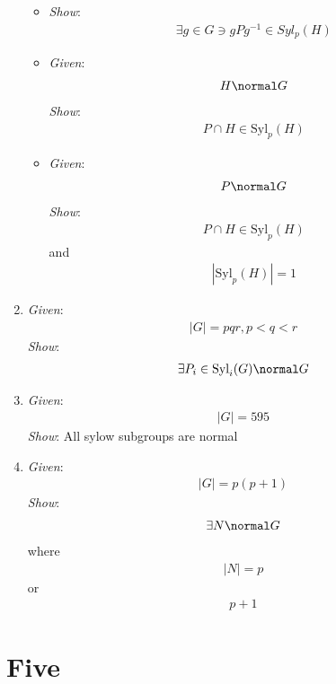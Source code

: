 \begin{enumerate}
  \begin{itemize}
  \tightlist
  \item
    \emph{Show}:
    \begin{align*}\exists g \in G \ni gPg^{-1} \in Syl_p(H)\end{align*}
  \item
    \emph{Given}: \begin{align*}H \normal G\end{align*} \emph{Show}:
    \begin{align*}P\cap H \in \text{Syl}_p(H)\end{align*}
  \item
    \emph{Given}: \begin{align*}P \normal G\end{align*} \emph{Show}:
    \begin{align*}P \cap H \in \text{Syl}_p(H)\end{align*} and
    \begin{align*}|\text{Syl}_p(H)| = 1\end{align*}
  \end{itemize}
\item
  \emph{Given}: \begin{align*}|G| = pqr, p < q < r\end{align*}
  \emph{Show}:
  \begin{align*}\exists P_i \in \text{Syl}_i(G) \normal G\end{align*}
\item
  \emph{Given}: \begin{align*}|G| =595\end{align*} \emph{Show}: All
  sylow subgroups are normal
\item
  \emph{Given}: \begin{align*}|G| = p(p+1)\end{align*} \emph{Show}:
  \begin{align*}\exists N \normal G\end{align*} where
  \begin{align*}|N| = p\end{align*} or \begin{align*}p+1\end{align*}
\end{enumerate}

\hypertarget{five}{%
\section{Five}\label{five}}

